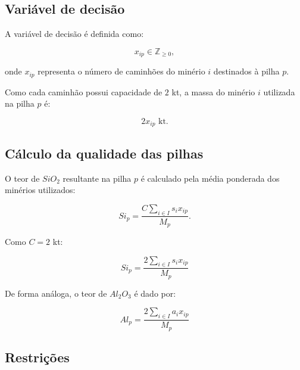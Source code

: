 \documentclass[12pt,a4paper]{article}
\begin{document}
\subsection{Variável de decisão}

A variável de decisão é definida como:

\begin{equation}
    x_{ip} \in \mathbb{Z}_{\geq 0},
\end{equation}

onde $x_{ip}$ representa o número de caminhões do minério $i$ destinados
à pilha $p$.

Como cada caminhão possui capacidade de $2$ kt, a massa do minério $i$
utilizada na pilha $p$ é:

\begin{equation}
    2x_{ip} \text{ kt}.
\end{equation}



\subsection{Cálculo da qualidade das pilhas}

O teor de $SiO_2$ resultante na pilha $p$ é calculado pela média ponderada
dos minérios utilizados:

\begin{equation}
Si_p =
\frac{
C\sum_{i\in I}s_i x_{ip}
}{
M_p
}.
\end{equation}

Como $C=2$ kt:

\begin{equation}
\boxed{
Si_p =
\frac{
2\sum_{i\in I}s_i x_{ip}
}{
M_p
}
}
\end{equation}

De forma análoga, o teor de $Al_2O_3$ é dado por:

\begin{equation}
\boxed{
Al_p =
\frac{
2\sum_{i\in I}a_i x_{ip}
}{
M_p
}
}
\end{equation}



\subsection{Restrições}
\end{document}
